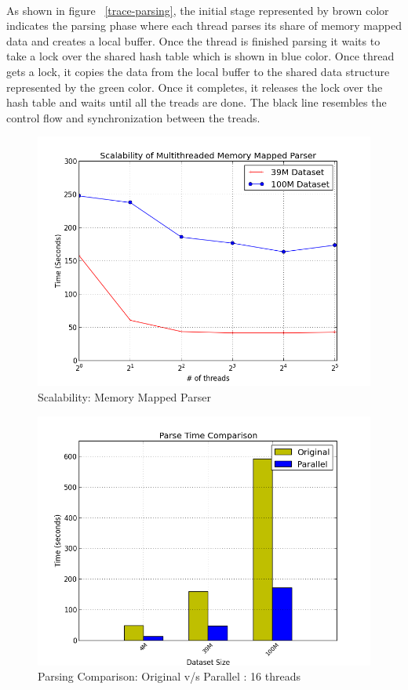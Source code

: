 \label{key}\documentclass[plainarticle, english ,zihtitle,final,hyperref,utf8]{zihpub}
\begin{document}
\paragraph{}
As shown in figure ~\ref{trace-parsing}, the initial stage represented by brown color indicates the parsing phase where each thread parses its share of memory mapped data and creates a local buffer. Once the thread is finished parsing it waits to take a lock over the shared hash table which is shown in blue color. Once thread gets a lock, it copies the data from the local buffer to the shared data structure represented by the green color. Once it completes, it releases the lock over the hash table and waits until all the treads are done. The black line resembles the control flow and synchronization between the treads. 
\begin{figure}[h]
\center
\includegraphics[scale=0.4]{scale_parse}
\caption{Scalability: Memory Mapped Parser}
\label{scale-parser}
\end{figure}
\begin{figure}
\center
\includegraphics[scale=0.4]{Parse_compare}
\caption{Parsing Comparison: Original v/s Parallel : 16 threads}
\label{compare-parser}
\end{figure}
\end{document}

